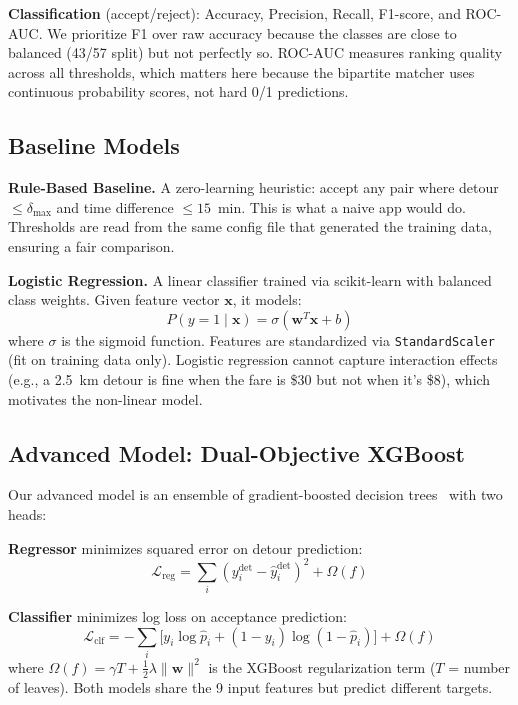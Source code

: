 \documentclass{article}
\begin{document}
\textbf{Classification} (accept/reject): Accuracy, Precision, Recall, F1-score, and ROC-AUC. We prioritize F1 over raw accuracy because the classes are close to balanced (43/57 split) but not perfectly so. ROC-AUC measures ranking quality across all thresholds, which matters here because the bipartite matcher uses continuous probability scores, not hard 0/1 predictions.

\subsection{Baseline Models}
\label{sec:baseline}

\textbf{Rule-Based Baseline.} A zero-learning heuristic: accept any pair where detour $\leq \delta_{\text{max}}$ and time difference $\leq 15$~min. This is what a naive app would do. Thresholds are read from the same config file that generated the training data, ensuring a fair comparison.

\textbf{Logistic Regression.} A linear classifier trained via scikit-learn with balanced class weights. Given feature vector $\mathbf{x}$, it models:
\begin{equation}
P(y=1 \mid \mathbf{x}) = \sigma(\mathbf{w}^T\mathbf{x} + b)
\end{equation}
where $\sigma$ is the sigmoid function. Features are standardized via \texttt{StandardScaler} (fit on training data only). Logistic regression cannot capture interaction effects (e.g., a 2.5~km detour is fine when the fare is \$30 but not when it's \$8), which motivates the non-linear model.

\subsection{Advanced Model: Dual-Objective XGBoost}
\label{sec:advanced}

Our advanced model is an ensemble of gradient-boosted decision trees~\citep{chen2016xgboost} with two heads:

\textbf{Regressor} minimizes squared error on detour prediction:
\begin{equation}
\mathcal{L}_{\text{reg}} = \sum_{i} (y_i^{\text{det}} - \hat{y}_i^{\text{det}})^2 + \Omega(f)
\end{equation}

\textbf{Classifier} minimizes log loss on acceptance prediction:
\begin{equation}
\mathcal{L}_{\text{clf}} = -\sum_{i} \big[ y_i \log \hat{p}_i + (1-y_i)\log(1-\hat{p}_i) \big] + \Omega(f)
\end{equation}
where $\Omega(f) = \gamma T + \frac{1}{2}\lambda \|\mathbf{w}\|^2$ is the XGBoost regularization term ($T$ = number of leaves). Both models share the 9 input features but predict different targets.
\end{document}
